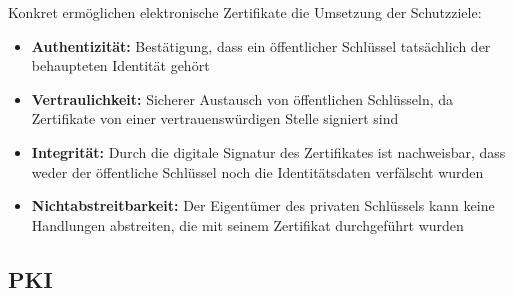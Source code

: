 \documentclass[a4paper]{article}
\begin{document}
Konkret ermöglichen elektronische Zertifikate die Umsetzung der Schutzziele:
\begin{itemize}
    \item \textbf{Authentizität:} Bestätigung, dass ein öffentlicher Schlüssel tatsächlich der behaupteten Identität gehört
    \item \textbf{Vertraulichkeit:} Sicherer Austausch von öffentlichen Schlüsseln, da Zertifikate von einer vertrauenswürdigen Stelle signiert sind
    \item \textbf{Integrität:} Durch die digitale Signatur des Zertifikates ist nachweisbar, dass weder der öffentliche Schlüssel noch die Identitätsdaten verfälscht wurden
    \item \textbf{Nichtabstreitbarkeit:} Der Eigentümer des privaten Schlüssels kann keine Handlungen abstreiten, die mit seinem Zertifikat durchgeführt wurden
\end{itemize}

\subsection{PKI}
\end{document}
